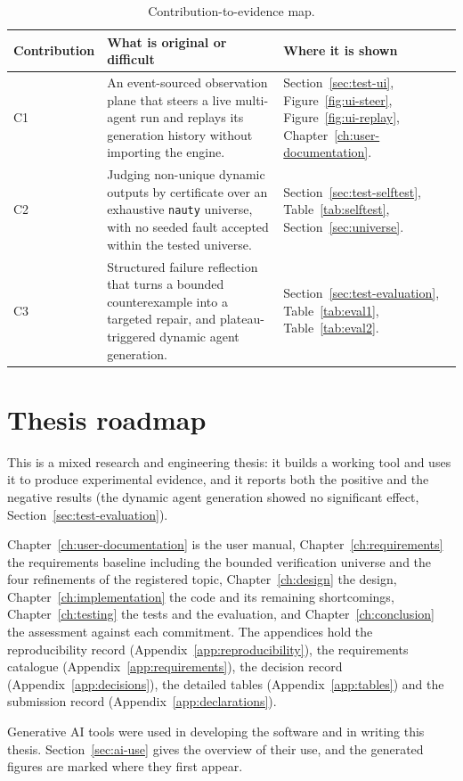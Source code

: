 \begin{table}[H]
  \centering
  \caption{Contribution-to-evidence map.}
  \label{tab:contribution-evidence}
  \begin{tabularx}{\textwidth}{@{}p{}X X@{}}
    \toprule
    \textbf{Contribution} & \textbf{What is original or difficult} & \textbf{Where it is shown} \\
    \midrule
    C1 & An event-sourced observation plane that steers a live multi-agent run and replays its generation history without importing the engine. & Section~\ref{sec:test-ui}, Figure~\ref{fig:ui-steer}, Figure~\ref{fig:ui-replay}, Chapter~\ref{ch:user-documentation}. \\
    \addlinespace[2pt]
    C2 & Judging non-unique dynamic outputs by certificate over an exhaustive \texttt{nauty} universe, with no seeded fault accepted within the tested universe. & Section~\ref{sec:test-selftest}, Table~\ref{tab:selftest}, Section~\ref{sec:universe}. \\
    \addlinespace[2pt]
    C3 & Structured failure reflection that turns a bounded counterexample into a targeted repair, and plateau-triggered dynamic agent generation. & Section~\ref{sec:test-evaluation}, Table~\ref{tab:eval1}, Table~\ref{tab:eval2}. \\
    \bottomrule
  \end{tabularx}
\end{table}

\section{Thesis roadmap}

This is a mixed research and engineering thesis: it builds a working tool and
uses it to produce experimental evidence, and it reports both the positive and
the negative results (the dynamic agent generation showed no significant effect,
Section~\ref{sec:test-evaluation}).

Chapter~\ref{ch:user-documentation} is the user manual,
Chapter~\ref{ch:requirements} the requirements baseline including the bounded
verification universe and the four refinements of the registered topic,
Chapter~\ref{ch:design} the design, Chapter~\ref{ch:implementation} the code
and its remaining shortcomings, Chapter~\ref{ch:testing} the tests and the
evaluation, and Chapter~\ref{ch:conclusion} the assessment against each
commitment. The appendices hold the reproducibility record
(Appendix~\ref{app:reproducibility}), the requirements catalogue
(Appendix~\ref{app:requirements}), the decision record
(Appendix~\ref{app:decisions}), the detailed tables
(Appendix~\ref{app:tables}) and the submission record
(Appendix~\ref{app:declarations}).

Generative AI tools were used in developing the software and in writing this
thesis. Section~\ref{sec:ai-use} gives the overview of their use, and the
generated figures are marked where they first appear.

